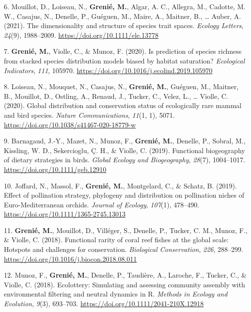 \documentclass[10pt,a4paper,]{article}
\begin{document}
\leavevmode{}%
6. Mouillot, D., Loiseau, N., \textbf{Grenié, M.}, Algar, A. C.,
Allegra, M., Cadotte, M. W., Casajus, N., Denelle, P., Guéguen, M.,
Maire, A., Maitner, B., \ldots{} Auber, A. (2021). The dimensionality
and structure of species trait spaces. \emph{Ecology Letters},
\emph{24}(9), 1988--2009. \url{https://doi.org/10.1111/ele.13778}

\leavevmode{}%
7. \textbf{Grenié, M.}, Violle, C., \& Munoz, F. (2020). Is prediction
of species richness from stacked species distribution models biased by
habitat saturation? \emph{Ecological Indicators}, \emph{111}, 105970.
\url{https://doi.org/10.1016/j.ecolind.2019.105970}

\leavevmode{}%
8. Loiseau, N., Mouquet, N., Casajus, N., \textbf{Grenié, M.}, Guéguen,
M., Maitner, B., Mouillot, D., Ostling, A., Renaud, J., Tucker, C.,
Velez, L., \ldots{} Violle, C. (2020). Global distribution and
conservation status of ecologically rare mammal and bird species.
\emph{Nature Communications}, \emph{11}(1, 1), 5071.
\url{https://doi.org/10.1038/s41467-020-18779-w}

\leavevmode{}%
9. Barnagaud, J.-Y., Mazet, N., Munoz, F., \textbf{Grenié, M.}, Denelle,
P., Sobral, M., Kissling, W. D., Sekercioglu, Ç. H., \& Violle, C.
(2019). Functional biogeography of dietary strategies in birds.
\emph{Global Ecology and Biogeography}, \emph{28}(7), 1004--1017.
\url{https://doi.org/10.1111/geb.12910}

\leavevmode{}%
10. Joffard, N., Massol, F., \textbf{Grenié, M.}, Montgelard, C., \&
Schatz, B. (2019). Effect of pollination strategy, phylogeny and
distribution on pollination niches of Euro-Mediterranean orchids.
\emph{Journal of Ecology}, \emph{107}(1), 478--490.
\url{https://doi.org/10.1111/1365-2745.13013}

\leavevmode{}%
11. \textbf{Grenié, M.}, Mouillot, D., Villéger, S., Denelle, P.,
Tucker, C. M., Munoz, F., \& Violle, C. (2018). Functional rarity of
coral reef fishes at the global scale: Hotspots and challenges for
conservation. \emph{Biological Conservation}, \emph{226}, 288--299.
\url{https://doi.org/10.1016/j.biocon.2018.08.011}

\leavevmode{}%
12. Munoz, F., \textbf{Grenié, M.}, Denelle, P., Taudière, A., Laroche,
F., Tucker, C., \& Violle, C. (2018). Ecolottery: Simulating and
assessing community assembly with environmental filtering and neutral
dynamics in R. \emph{Methods in Ecology and Evolution}, \emph{9}(3),
693--703. \url{https://doi.org/10.1111/2041-210X.12918}
\end{document}
